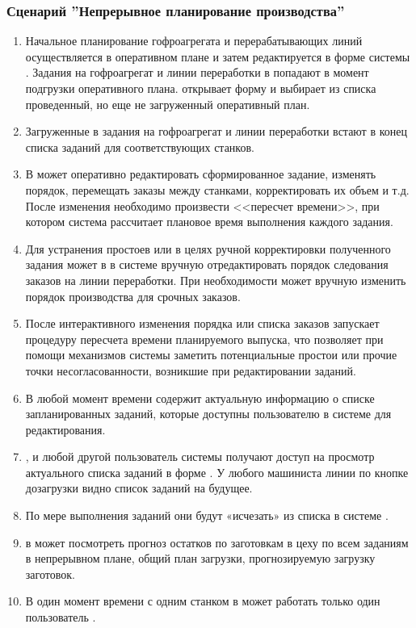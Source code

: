 
\subsubsection{Сценарий ''Непрерывное планирование производства''}
\label{bp:plan_4}

\begin{enumerate}


\item Начальное планирование гофроагрегата и перерабатывающих линий осуществляется в оперативном плане и затем редактируется в форме  системы \gofro. Задания на гофроагрегат и линии переработки в  попадают в момент подгрузки  \planner оперативного плана. \planner открывает форму  и выбирает из списка проведенный, но еще не загруженный оперативный план.
\item	Загруженные в  задания на гофроагрегат и линии переработки встают в конец списка заданий для соответствующих станков.
\item	В  \planner может оперативно редактировать сформированное задание, изменять порядок, перемещать заказы между станками, корректировать их объем и т.д. После изменения необходимо произвести <<пересчет времени>>, при котором система рассчитает плановое время выполнения каждого задания.
\item	Для устранения простоев или в целях ручной корректировки полученного задания \planner  может в  в системе \gofro вручную отредактировать порядок следования заказов на линии переработки. При необходимости \planner может вручную изменить порядок производства для срочных заказов.
\item	После интерактивного изменения порядка или списка заказов \planner запускает процедуру пересчета времени планируемого выпуска, что позволяет при помощи механизмов системы  \gofro заметить потенциальные простои или прочие точки несогласованности, возникшие при редактировании заданий.
\item	В любой момент времени  содержит актуальную информацию о списке запланированных заданий, которые доступны пользователю \planner в системе \gofro для редактирования.
\item	\master, \manager и любой другой пользователь системы \gofro получают доступ на просмотр актуального списка заданий в форме . У любого машиниста линии по кнопке дозагрузки видно список заданий на будущее.
\item	По мере выполнения заданий они будут «исчезать» из списка    в системе \gofro.
\item	\planner в  может посмотреть прогноз  остатков по заготовкам в цеху по всем заданиям в непрерывном плане, общий план загрузки, прогнозируемую загрузку заготовок.
\item	В один момент времени с одним станком в  может работать только один пользователь \planner.




\end{enumerate}
